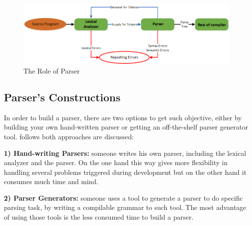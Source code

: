{{{{{\begin{figure}[ht]
	\begin{center}
		\includegraphics[scale=0.55,angle=0]{images/ParserRole}
		\caption{The Role of Parser}
		\label{Fig:parserPosition}
	\end{center}
\end{figure}
\subsection{Parser's Constructions}
In order to build a parser, there are two options to get such objective, either by building your own hand-written parser or getting an off-the-shelf parser generator tool. follows both approaches are discussed:
\par \textbf{1) Hand-writing Parsers:} someone writes his own parser, including the lexical analyzer and the parser. On the one hand this way gives more flexibility in handling several problems triggered during development but on the other hand it consumes much time and mind.
\par \textbf{2) Parser Generators:} someone uses a tool to generate a parser to do specific parsing task, by writing a compilable grammar to such tool. The most advantage of using those tools is the less consumed time to build a parser.  

}}}}}
